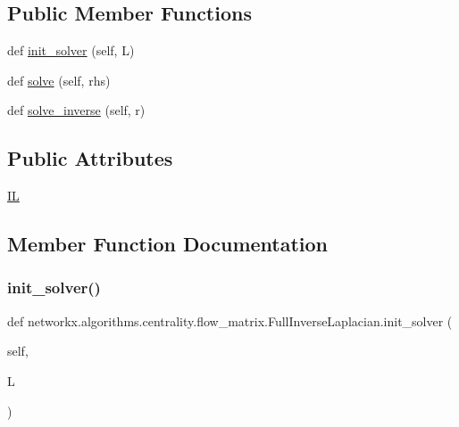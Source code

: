 \subsection*{Public Member Functions}
\begin{DoxyCompactItemize}
\item 
def \hyperlink{classnetworkx_1_1algorithms_1_1centrality_1_1flow__matrix_1_1FullInverseLaplacian_a3d7de3fce8616f277d33e77ce55883f5}{init\+\_\+solver} (self, L)
\item 
def \hyperlink{classnetworkx_1_1algorithms_1_1centrality_1_1flow__matrix_1_1FullInverseLaplacian_ab2b88352c08c58bbd66910445bde319d}{solve} (self, rhs)
\item 
def \hyperlink{classnetworkx_1_1algorithms_1_1centrality_1_1flow__matrix_1_1FullInverseLaplacian_aba287ed60ab67e63658a171c53f981d1}{solve\+\_\+inverse} (self, r)
\end{DoxyCompactItemize}
\subsection*{Public Attributes}
\begin{DoxyCompactItemize}
\item 
\hyperlink{classnetworkx_1_1algorithms_1_1centrality_1_1flow__matrix_1_1FullInverseLaplacian_ab4b5f4843d89947ecad6f37b77871a42}{IL}
\end{DoxyCompactItemize}


\subsection{Member Function Documentation}
\mbox{\label{classnetworkx_1_1algorithms_1_1centrality_1_1flow__matrix_1_1FullInverseLaplacian_a3d7de3fce8616f277d33e77ce55883f5}} 
\subsubsection{\texorpdfstring{init\+\_\+solver()}{init\_solver()}}
{\footnotesize\ttfamily def networkx.\+algorithms.\+centrality.\+flow\+\_\+matrix.\+Full\+Inverse\+Laplacian.\+init\+\_\+solver (\begin{DoxyParamCaption}\item[{}]{self,  }\item[{}]{L }\end{DoxyParamCaption})}

